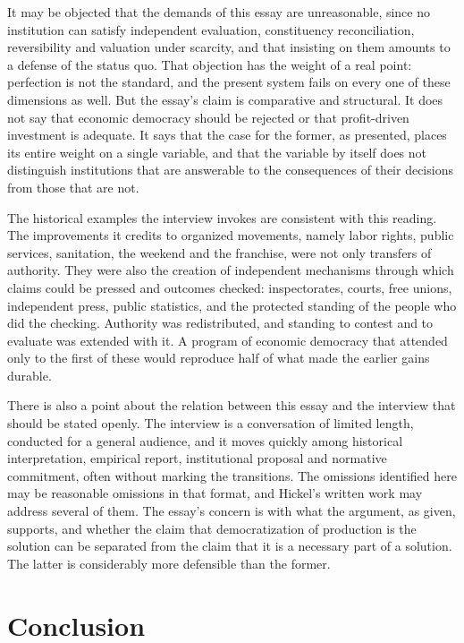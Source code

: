 \documentclass[12pt]{article}
\theoremstyle{definition}
\begin{document}
It may be objected that the demands of this essay are unreasonable, since no institution can satisfy independent evaluation, constituency reconciliation, reversibility and valuation under scarcity, and that insisting on them amounts to a defense of the status quo. That objection has the weight of a real point: perfection is not the standard, and the present system fails on every one of these dimensions as well. But the essay's claim is comparative and structural. It does not say that economic democracy should be rejected or that profit-driven investment is adequate. It says that the case for the former, as presented, places its entire weight on a single variable, and that the variable by itself does not distinguish institutions that are answerable to the consequences of their decisions from those that are not.

The historical examples the interview invokes are consistent with this reading. The improvements it credits to organized movements, namely labor rights, public services, sanitation, the weekend and the franchise, were not only transfers of authority. They were also the creation of independent mechanisms through which claims could be pressed and outcomes checked: inspectorates, courts, free unions, independent press, public statistics, and the protected standing of the people who did the checking. Authority was redistributed, and standing to contest and to evaluate was extended with it. A program of economic democracy that attended only to the first of these would reproduce half of what made the earlier gains durable.

There is also a point about the relation between this essay and the interview that should be stated openly. The interview is a conversation of limited length, conducted for a general audience, and it moves quickly among historical interpretation, empirical report, institutional proposal and normative commitment, often without marking the transitions. The omissions identified here may be reasonable omissions in that format, and Hickel's written work may address several of them. The essay's concern is with what the argument, as given, supports, and whether the claim that democratization of production is the solution can be separated from the claim that it is a necessary part of a solution. The latter is considerably more defensible than the former.

\section{Conclusion}
\end{document}
